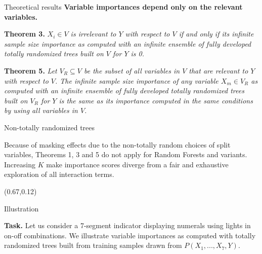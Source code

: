 \documentclass[final]{beamer}
\newcommand{\cmark}{\ding{51}}%
\newcommand{\xmark}{\ding{55}}%
\begin{document}
\begin{frame}{}
\begin{textblock}{0.32}
\begin{block}{Theoretical results \phantom{p}}
{\color{green} \cmark} \textbf{Variable importances depend only on the relevant
variables.}

\vspace{0.3cm}

\textbf{Theorem 3.}
\textit{$X_i \in V$ is irrelevant to $Y$ with respect to $V$ if and only if  its
infinite sample size importance as computed with an infinite ensemble of fully
developed totally randomized trees built on $V$ for $Y$ is 0.}

\vspace{0.3cm}

\textbf{Theorem 5.}
\textit{Let $V_R \subseteq V$ be the subset of all variables in $V$ that are relevant to $Y$ with
respect to $V$. The infinite sample size importance of any variable $X_m \in
V_R$ as computed with an infinite ensemble of fully developed totally randomized
trees built on $V_R$ for $Y$ is the same as its importance computed in the same conditions by using all variables in $V$.}

\end{block}

\vspace{0.5cm}
\begin{block}{Non-totally randomized trees \phantom{p}}

{\color{red} \xmark} Because of masking effects due to the non-totally random
choices of split variables, Theorems 1, 3 and 5 do not apply for Random Forests
and variants. Increasing $K$ make importance scores diverge from a fair and
exhaustive exploration of all interaction terms.

\end{block}

\end{textblock}



\begin{textblock}{0.32}(0.67,0.12)

\begin{block}{Illustration \phantom{p}}

\textbf{Task.} Let us consider a 7-segment indicator displaying numerals
using lights in on-off combinations. We illustrate
variable importances as computed with totally randomized trees built
from training samples drawn from $P(X_1, ..., X_7, Y)$.


\end{block}
\end{textblock}
\end{frame}
\end{document}
